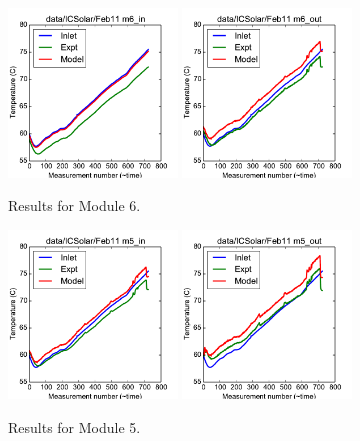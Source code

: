 \documentclass{article}
\begin{document}
\begin{figure}[!ht]
\centering
\includegraphics[width=0.4\textwidth]{../../data/ICSolar/images/Feb11_m6_in.pdf}\hspace{0.05\textwidth}
\includegraphics[width=0.4\textwidth]{../../data/ICSolar/images/Feb11_m6_out.pdf}\hspace{0.05\textwidth}\\
\caption{Results for Module 6.}\end{figure}
\begin{figure}[!ht]
\centering
\includegraphics[width=0.4\textwidth]{../../data/ICSolar/images/Feb11_m5_in.pdf}\hspace{0.05\textwidth}
\includegraphics[width=0.4\textwidth]{../../data/ICSolar/images/Feb11_m5_out.pdf}\hspace{0.05\textwidth}\\
\caption{Results for Module 5.}\end{figure}
\end{document}
